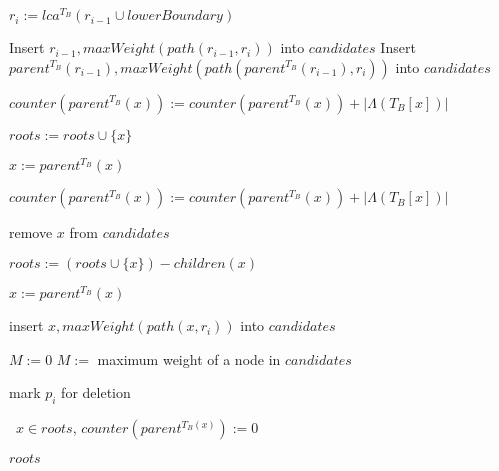 \documentclass{article}
\newcommand{\leafset}{\Lambda}
\begin{document}
\begin{algorithm}
\begin{algorithmic}[1]
                \State $r_i := lca^{T_B}(r_{i-1} \cup lowerBoundary)$

                    \State Insert $r_{i-1}, maxWeight(path(r_{i-1}, r_i))$ into $candidates$
                \Else
                    \State Insert $parent^{T_B}(r_{i-1}), maxWeight(path(parent^{T_B}(r_{i-1}), r_i))$ into $candidates$
                \EndIf

                    \State $counter(parent^{T_B}(x)) := counter(parent^{T_B}(x)) + |\leafset(T_B[x])|$

                    \State $roots := roots \cup \{x\}$

                    \State $x := parent^{T_B}(x)$

                    \While{$counter(x) = |\leafset(T_B[x])|$}
                        \State $counter(parent^{T_B}(x)) := counter(parent^{T_B}(x)) + |\leafset(T_B[x])|$

                         remove $x$ from $candidates$

                        \State $roots := (roots \cup \{x\}) - children(x)$

                        \State $x := parent^{T_B}(x)$
                    \EndWhile

                     insert $x, maxWeight(path(x, r_i))$ into $candidates$
                \EndFor

                    {$M := 0$}
                    $M :=$ maximum weight of a node in $candidates$

                \IIf{$w(\leafset(T_A[p_i])) \leq M$}
                    mark $p_i$ for deletion
            \EndFor

            \State \algorithmicforall\ $x \in roots$, $counter(parent^{T_B(x)}) := 0$

            \State \Return $roots$
        \end{algorithmic}
    \end{algorithm}
\end{document}
